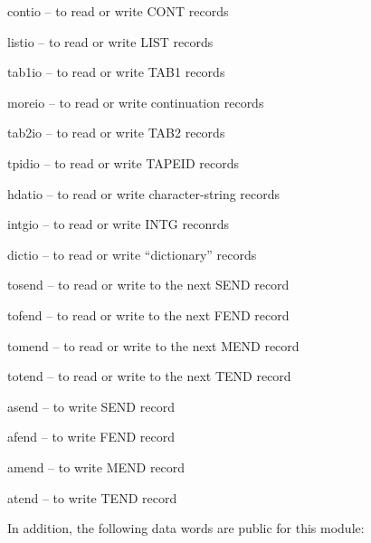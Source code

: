 \begin{description}
\begin{singlespace}
\item[contio --] to read or write CONT records

\item[listio --] to read or write LIST records

\item[tab1io --] to read or write TAB1 records

\item[moreio --] to read or write continuation records

\item[tab2io --] to read or write TAB2 records

\item[tpidio --] to read or write TAPEID records

\item[hdatio --] to read or write character-string records

\item[intgio --] to read or write INTG reconrds

\item[dictio --] to read or write ``dictionary'' records

\item[tosend --] to read or write to the next SEND record

\item[tofend --] to read or write to the next FEND record

\item[tomend --] to read or write to the next MEND record

\item[totend --] to read or write to the next TEND record

\item[asend --] to write SEND record

\item[afend --] to write FEND record

\item[amend --] to write MEND record

\item[atend --] to write TEND record
\end{singlespace}
\end{description}
\noindent
In addition, the following data words are public for this module:
